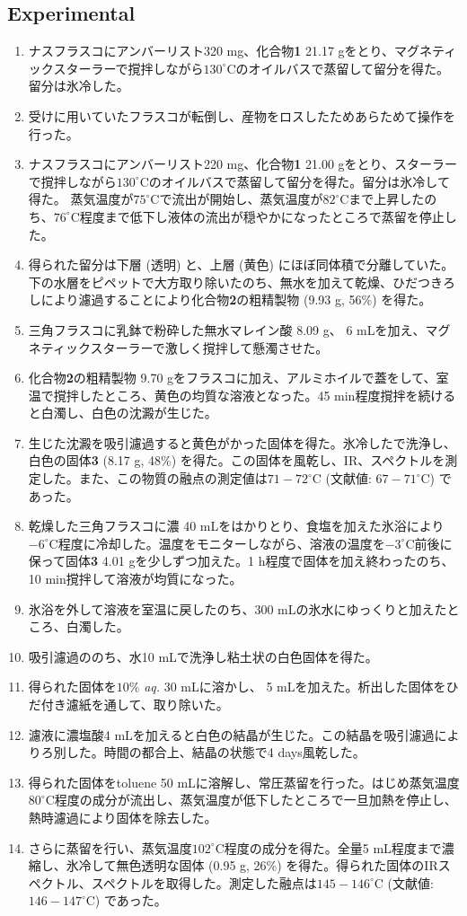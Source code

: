 \documentclass{ltjsarticle}
\theoremstyle{definition}
\numberwithin{equation}{section}
\newcommand{\D}{^\circ\text{C}}
\begin{document}
\subsection{Experimental}
\begin{enumerate}
\item ナスフラスコにアンバーリスト320 mg、化合物\textbf{1} 21.17 gをとり、マグネティックスターラーで撹拌しながら$130\D$のオイルバスで蒸留して留分を得た。留分は氷冷した。
\item 受けに用いていたフラスコが転倒し、産物をロスしたためあらためて操作を行った。
\item ナスフラスコにアンバーリスト220 mg、化合物\textbf{1} 21.00 gをとり、スターラーで撹拌しながら$130\D$のオイルバスで蒸留して留分を得た。留分は氷冷して得た。
蒸気温度が$75\D$で流出が開始し、蒸気温度が$82\D$まで上昇したのち、$76\D$程度まで低下し液体の流出が穏やかになったところで蒸留を停止した。
\item 得られた留分は下層 (透明) と、上層 (黄色) にほぼ同体積で分離していた。下の水層をピペットで大方取り除いたのち、無水を加えて乾燥、ひだつきろしにより濾過することにより化合物\textbf{2}の粗精製物 (9.93 g, 56\%) を得た。
\item 三角フラスコに乳鉢で粉砕した無水マレイン酸 8.09 g、 6 mLを加え、マグネティックスターラーで激しく撹拌して懸濁させた。
\item 化合物\textbf{2}の粗精製物 9.70 gをフラスコに加え、アルミホイルで蓋をして、室温で撹拌したところ、黄色の均質な溶液となった。45 min程度撹拌を続けると白濁し、白色の沈澱が生じた。
\item 生じた沈澱を吸引濾過すると黄色がかった固体を得た。氷冷したで洗浄し、白色の固体\textbf{3} (8.17 g, 48\%) を得た。この固体を風乾し、IR、スペクトルを測定した。また、この物質の融点の測定値は$71-72\D$ (文献値: $67-71\D$) であった。
\item 乾燥した三角フラスコに濃 40 mLをはかりとり、食塩を加えた氷浴により$-6\D$程度に冷却した。温度をモニターしながら、溶液の温度を$-3\D$前後に保って固体\textbf{3} 4.01 gを少しずつ加えた。1 h程度で固体を加え終わったのち、10 min撹拌して溶液が均質になった。
\item 氷浴を外して溶液を室温に戻したのち、300 mLの氷水にゆっくりと加えたところ、白濁した。
\item 吸引濾過ののち、水10 mLで洗浄し粘土状の白色固体を得た。
\item 得られた固体を$10\%$ \textit{aq.} 30 mLに溶かし、 5 mLを加えた。析出した固体をひだ付き濾紙を通して、取り除いた。
\item 濾液に濃塩酸4 mLを加えると白色の結晶が生じた。この結晶を吸引濾過によりろ別した。時間の都合上、結晶の状態で4 days風乾した。
\item 得られた固体をtoluene 50 mLに溶解し、常圧蒸留を行った。はじめ蒸気温度$80\D$程度の成分が流出し、蒸気温度が低下したところで一旦加熱を停止し、熱時濾過により固体を除去した。
\item さらに蒸留を行い、蒸気温度$102\D$程度の成分を得た。全量5 mL程度まで濃縮し、氷冷して無色透明な固体 (0.95 g, 26\%) を得た。得られた固体のIRスペクトル、スペクトルを取得した。測定した融点は$145-146\D$ (文献値: $146-147\D$) であった。
\end{enumerate}
\end{document}
